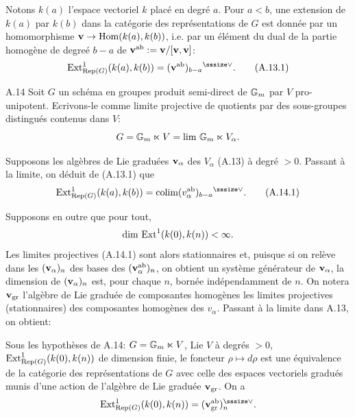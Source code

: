 Notons $k(a)$ l'espace vectoriel $k$
plac\'e en degr\'e $a$.
Pour $a<b$, une extension de $k(a)$ par
$k(b)$ dans la cat\'egorie des
repr\'esentations de $G$ est donn\'ee par un
homomorphisme $\bold{v}\to
\text{\rm Hom}(k(a),k(b))$, i.e.
par un \'el\'ement du dual de la partie
homog\`ene de degre\'e $b-a$ de $\bold{v}^{\text{\rm ab}}:=
\bold{v}/[\bold{v},\bold{v}]$:
$$
\Ext_{\Rep(G)}^1(k(a),k(b))=
(\bfv^{\ab})_{b-a}{\upvee}.
\tag{A.13.1}
$$

\subhead
A.14
\endsubhead
Soit $G$ un sch\'ema en groupes produit
semi-direct de  ${\Bbb G}_m$ par $V$
pro-unipotent.
Ecrivons-le comme limite projective de
quotients par des sous-groupes distingu\'es
contenus dans $V$:
$$
G={\Bbb G}_m\ltimes V=\lim\,{\Bbb G}_m\ltimes
V_\alpha.
$$

Supposons les alg\`ebres de Lie gradu\'ees
$\bold{v}_\alpha$ des $V_\alpha$ (A.13) \`a
degr\'e $>0$.
Passant \`a la limite, on d\'eduit de (A.13.1)
que
$$
\Ext_{\Rep(G)}^1(k(a),k(b))=
\colim(v_\alpha^{\ab})_{b-a}{\upvee}.
\tag{A.14.1}
$$

Supposons en outre que pour tout,
$$
\dim\,\text{\rm Ext}^1(k(0),k(n))<\infty.
$$
Les limites projectives (A.14.1) sont alors
stationnaires et, puisque si on rel\`eve dans les
$(\bold{v}_\alpha)_n$ des bases des
$(\bold{v}_\alpha^{\text{\rm ab}})_n$, on obtient un syst\`eme
g\'en\'erateur de $\bold{v}_\alpha$, la dimension de
$(\bold{v}_\alpha)_n$ est, pour chaque $n$, born\'ee
ind\'ependamment de $n$.
On notera $\bold{v}_{\text{\rm gr}}$ l'alg\`ebre de Lie
gradu\'ee de composantes homog\`enes les
limites projectives (stationnaires) des
composantes homog\`enes des $v_\alpha$.
Passant \`a la limite dans A.13, on obtient:

Sous les hypoth\`eses de A.14:
$G={\Bbb G}_m\ltimes V$, Lie $V$ \`a degr\'es
$>0$, $\text{\rm Ext}_{\text{\rm Rep}(G)}^1(k(0),k(n))$
de dimension finie, le foncteur $\rho\mapsto
d\rho$ est une \'equivalence de la cat\'egorie
des repr\'esentations de $G$ avec celle des
espaces vectoriels gradu\'es munis d'une 
action de l'alg\`ebre de Lie gradu\'ee
$\bold{v}_{\text{\rm gr}}$.
On a
$$
\Ext_{\Rep(G)}^1(k(0),k(n))=
(\bfv_{\GR}^{\ab})_n\upvee.
$$
\endproclaim

